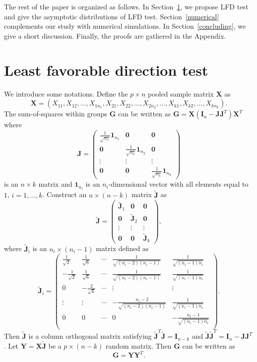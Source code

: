\documentclass[12pt]{article} %
\newcommand{\bX}{\mathbf{X}}
\newcommand{\bY}{\mathbf{Y}}
\newcommand{\bG}{\mathbf{G}}
\newcommand{\bJ}{\mathbf{J}}
\newcommand{\bI}{\mathbf{I}}
\theoremstyle{definition}
\begin{document}
    The rest of the paper is organized  as follows.
    In Section~\ref{methodology}, we propose LFD test and give
    the asymptotic distributions of LFD test.
     Section~\ref{numerical} complements our study with numerical simulations.
     In Section~\ref{concluding}, we give a short discussion.
     Finally, the proofs are gathered in the Appendix.





 
\section{Least favorable direction test}\label{methodology}
We introduce some notations.
 Define the $p\times n$ pooled sample matrix $\bX$ as
 $$\bX=(X_{11},X_{12},\ldots,X_{1n_1},X_{21},X_{22},\ldots,X_{2n_2},\ldots,X_{k1},X_{k2},\ldots,X_{kn_k}).$$
 The sum-of-squares within groups $\bG$ can be written as $\bG=\bX(\bI_n-\bJ\bJ^T)\bX^T$ where
 $$
 \bJ=\begin{pmatrix}
     \frac{1}{\sqrt{n_1}}\mathbf{1}_{n_1}&\mathbf{0} & \mathbf{0}\\
     \mathbf{0}&\frac{1}{\sqrt{n_2}} \mathbf{1}_{n_2}& \mathbf{0}\\
     \vdots &\vdots &\vdots \\
     \mathbf{0}&\mathbf{0}&\frac{1}{\sqrt{n_k}}\mathbf{1}_{n_k}
 \end{pmatrix}
 $$
 is an $n\times k$ matrix
 and $\mathbf{1}_{n_i}$ is an $n_i$-dimensional vector with all elements equal to $1$, $i=1,\ldots, k$.
 Construct an $n\times (n-k)$ matrix $\tilde{\bJ}$ as 
 $$
 \tilde{\bJ}=\begin{pmatrix}
     \tilde{\bJ}_1&\mathbf{0} & \mathbf{0}\\
     \mathbf{0}&\tilde{\bJ}_2& \mathbf{0}\\
     \vdots &\vdots &\vdots \\
     \mathbf{0}&\mathbf{0}&\tilde{\bJ}_k
 \end{pmatrix},
 $$
 where $\tilde{\bJ}_i$ is an $n_i\times (n_{i}-1)$ matrix defined as
 $$
\tilde{\bJ}_i=\begin{pmatrix}
    \frac{1}{\sqrt{2}}&\frac{1}{\sqrt{6}}&\cdots&\frac{1}{\sqrt{(n_i-2)(n_i-1)}}&\frac{1}{\sqrt{(n_i-1)n_i}}\\
    -\frac{1}{\sqrt{2}}&\frac{1}{\sqrt{6}}&\cdots&\frac{1}{\sqrt{(n_i-2)(n_i-1)}}&\frac{1}{\sqrt{(n_i-1)n_i}}\\
    0&-\frac{2}{\sqrt{6}}&\cdots&\vdots&\vdots\\
    \vdots&\vdots&\cdots&-\frac{n_i-2}{\sqrt{(n_i-2)(n_i-1)}}&\frac{1}{\sqrt{(n_i-1)n_i}}\\
    0&0&\cdots&0&-\frac{n_i-1}{\sqrt{(n_i-1)n_i}}\\
\end{pmatrix}.
 $$
Then $\tilde{\bJ}$ is a column orthogonal matrix  satisfying $\tilde{\bJ}^T\tilde{\bJ}=\bI_{n-k}$ and $\tilde{\bJ}\tilde{\bJ}^T =\bI_n-\bJ\bJ^T$.
Let $\bY=\bX\tilde{\bJ}$ be a $p\times (n-k)$ random matrix.
Then $\bG$ can be written as
$$\bG=
\bY \bY^T.
$$
\end{document}
